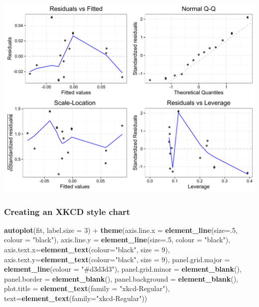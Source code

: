 \documentclass[]{article}
\newenvironment{Shaded}{\begin{snugshade}}{\end{snugshade}}
\newcommand{\KeywordTok}[1]{\textcolor[rgb]{0.13,0.29,0.53}{\textbf{{#1}}}}
\newcommand{\DataTypeTok}[1]{\textcolor[rgb]{0.13,0.29,0.53}{{#1}}}
\newcommand{\DecValTok}[1]{\textcolor[rgb]{0.00,0.00,0.81}{{#1}}}
\newcommand{\StringTok}[1]{\textcolor[rgb]{0.31,0.60,0.02}{{#1}}}
\newcommand{\NormalTok}[1]{{#1}}
\begin{document}
\begin{center}\includegraphics{0_all_posts_pdf/lr_19-1} \end{center}

\subsubsection{Creating an XKCD style
chart}\label{creating-an-xkcd-style-chart-11}

\begin{Shaded}
\begin{Highlighting}[]
\KeywordTok{autoplot}\NormalTok{(fit, }\DataTypeTok{label.size =} \DecValTok{3}\NormalTok{) +}\StringTok{ }\KeywordTok{theme}\NormalTok{(}\DataTypeTok{axis.line.x =} \KeywordTok{element_line}\NormalTok{(}\DataTypeTok{size=}\NormalTok{.}\DecValTok{5}\NormalTok{, }\DataTypeTok{colour =} \StringTok{"black"}\NormalTok{),}
            \DataTypeTok{axis.line.y =} \KeywordTok{element_line}\NormalTok{(}\DataTypeTok{size=}\NormalTok{.}\DecValTok{5}\NormalTok{, }\DataTypeTok{colour =} \StringTok{"black"}\NormalTok{), }
            \DataTypeTok{axis.text.x=}\KeywordTok{element_text}\NormalTok{(}\DataTypeTok{colour=}\StringTok{"black"}\NormalTok{, }\DataTypeTok{size =} \DecValTok{9}\NormalTok{), }
            \DataTypeTok{axis.text.y=}\KeywordTok{element_text}\NormalTok{(}\DataTypeTok{colour=}\StringTok{"black"}\NormalTok{, }\DataTypeTok{size =} \DecValTok{9}\NormalTok{),}
            \DataTypeTok{panel.grid.major =} \KeywordTok{element_line}\NormalTok{(}\DataTypeTok{colour =} \StringTok{"#d3d3d3"}\NormalTok{), }
            \DataTypeTok{panel.grid.minor =} \KeywordTok{element_blank}\NormalTok{(), }
            \DataTypeTok{panel.border =} \KeywordTok{element_blank}\NormalTok{(), }\DataTypeTok{panel.background =} \KeywordTok{element_blank}\NormalTok{(),}
            \DataTypeTok{plot.title =} \KeywordTok{element_text}\NormalTok{(}\DataTypeTok{family =} \StringTok{"xkcd-Regular"}\NormalTok{),}
            \DataTypeTok{text=}\KeywordTok{element_text}\NormalTok{(}\DataTypeTok{family=}\StringTok{"xkcd-Regular"}\NormalTok{))}
\end{Highlighting}
\end{Shaded}
\end{document}
